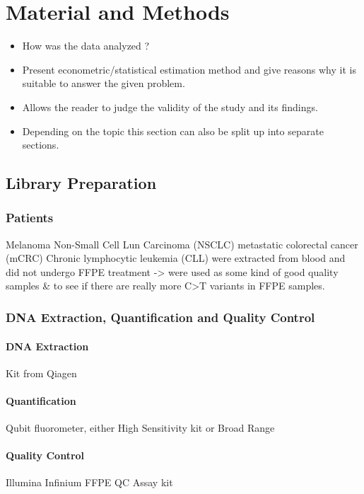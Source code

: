 \section{Material and Methods}

\begin{itemize}

\item How was the data analyzed ?

\item Present econometric/statistical estimation method and
give reasons why it is suitable to answer the given problem.

\item Allows the reader to judge the validity of the study and
its findings.

\item Depending on the topic this section can also be split up
into separate sections.

\end{itemize}

\subsection{Library Preparation}
\subsubsection{Patients}
Melanoma
Non-Small Cell Lun Carcinoma (NSCLC)
metastatic colorectal cancer (mCRC)
Chronic lymphocytic leukemia (CLL) were extracted from blood and did not undergo
FFPE treatment -> were used as some kind of good quality samples & to see if there
are really more C>T variants in FFPE samples.

\subsubsection{DNA Extraction, Quantification and Quality Control}
\paragraph{DNA Extraction}
Kit from Qiagen
\paragraph{Quantification}
Qubit fluorometer, either High Sensitivity kit or Broad Range
\paragraph{Quality Control}
Illumina Infinium FFPE QC Assay kit
